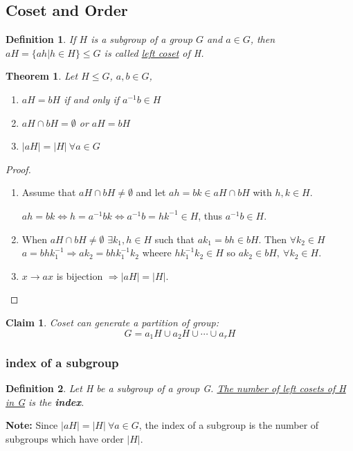\documentclass[11pt,a4paper]{article}
\newtheorem{theorem}{Theorem}
\newtheorem{claim}{Claim}
\newtheorem{definition}{Definition}
\begin{document}
\subsection{Coset and Order}
\begin{definition}
If $H$ is a subgroup of a group $G$ and $a\in G$, then $aH=\{ah|h\in H\}\leq G$ is called \underline{left coset} of H.
\end{definition}
\begin{theorem}
Let $H\leq G$, $a,b\in G$,
\begin{enumerate}
    \item $aH=bH$ if and only if $a^{-1}b\in H$
    \item $aH\cap bH=\emptyset$ or $aH=bH$
    \item $|aH|=|H|\ \forall a\in G$
\end{enumerate}
\end{theorem}
\begin{proof}
    \quad

    \begin{enumerate}
        \item Assume that $aH\cap bH\neq \emptyset$ and let $ah=bk\in aH\cap bH$ with $h,k\in H$.

        $ah=bk\Leftrightarrow h=a^{-1}bk \Leftrightarrow a^{-1}b=hk^{-1}\in H$, thus $a^{-1}b\in H$.
        \item When $aH\cap bH\neq \emptyset$ $\exists k_1,h\in H$ such that $ak_1=bh\in bH$. Then $\forall k_2\in H$ $a=bhk_1^{-1} \Rightarrow ak_2=bhk_1^{-1}k_2$ wheere $hk_1^{-1}k_2\in H$ so $ak_2\in bH,\ \forall k_2\in H$.
        \item $x \rightarrow ax$ is bijection $\Rightarrow |aH|=|H|$.
    \end{enumerate}
\end{proof}

\begin{claim}
Coset can generate a partition of group:
$$G=a_1H\cup a_2H\cup \cdots \cup a_rH$$
\end{claim}

\subsubsection{index of a subgroup}
\begin{definition}
    Let H be a subgroup of a group G. \underline{The number of left cosets of H in G} is the \textbf{index}.
\end{definition}
\textbf{Note:} Since $|aH|=|H|\ \forall a\in G$, the index of a subgroup is the number of subgroups which have order $|H|$.
\end{document}
